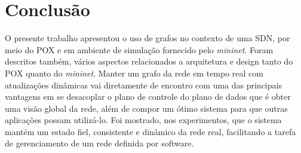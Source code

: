 \section{Conclusão}
\label{sec:conclusion}

O presente trabalho apresentou o uso de grafos
no contexto de uma SDN, por meio do POX e
em ambiente de simulação fornecido pelo \emph{mininet}.
Foram descritos também, vários aspectos relacionados a arquitetura e design 
tanto do POX quanto do \emph{mininet}.
Manter um grafo da rede em tempo real com atualizações dinâmicas vai
diretamente de encontro com uma das principais vantagens em se 
desacoplar o plano de controle do plano de dados que é obter uma 
visão global da rede,  
além de compor um ótimo sistema para que outras aplicações 
possam utilizá-lo.
Foi mostrado, nos experimentos, que o sistema mantém um estado fiel, 
consistente e dinâmico da rede real, 
facilitando a tarefa de gerenciamento de um rede definida por 
software.